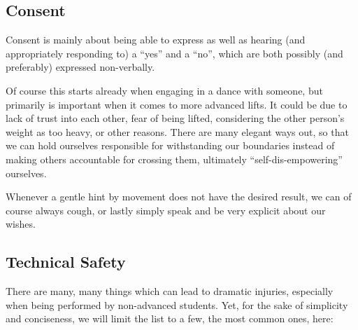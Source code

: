 \subsection{Consent}\label{subsec:consent}

Consent is mainly about being able to express as well as hearing (and appropriately responding to) a ``yes'' and a ``no'', which are both possibly (and preferably) expressed non-verbally.

Of course this starts already when engaging in a dance with someone, but primarily is important when it comes to more advanced lifts.
It could be due to lack of trust into each other, fear of being lifted, considering the other person's weight as too heavy, or other reasons.
There are many elegant ways out, so that we can hold ourselves responsible for withstanding our boundaries instead of making others accountable for crossing them, ultimately ``self-dis-empowering'' ourselves.

Whenever a gentle hint by movement does not have the desired result, we can of course always cough, or lastly simply speak and be very explicit about our wishes.

\subsection{Technical Safety}\label{subsec:technical-safety}

There are many, many things which can lead to dramatic injuries, especially when being performed by non-advanced students.
Yet, for the sake of simplicity and conciseness, we will limit the list to a few, the most common ones, here:

